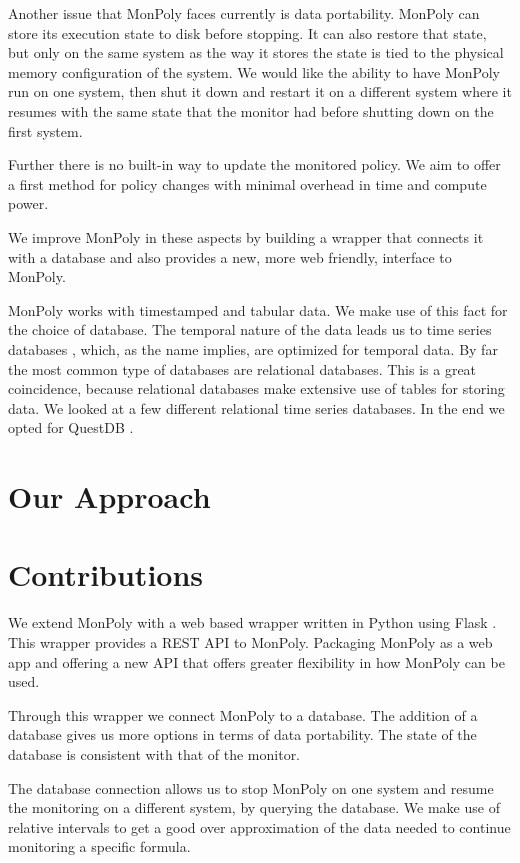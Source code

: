 Another issue that MonPoly faces currently is data portability.
MonPoly can store its execution state to disk before stopping.
It can also restore that state, but only on the same system as the way it stores the state is tied to the physical memory configuration of the system.
We would like the ability to have MonPoly run on one system, then shut it down and restart it on a different system where it resumes with the same state that the monitor had before shutting down on the first system.

Further there is no built-in way to update the monitored policy.
We aim to offer a first method for policy changes with minimal overhead in time and compute power.

We improve MonPoly in these aspects by building a wrapper that connects it with a database and also provides a new, more web friendly, interface to MonPoly.


MonPoly works with timestamped and tabular data.
We make use of this fact for the choice of database.
The temporal nature of the data leads us to time series databases \cite{}, which, as the name implies, are optimized for temporal data.
By far the most common type of databases are relational databases.
This is a great coincidence, because relational databases make extensive use of tables for storing data.
We looked at a few different relational time series databases.
In the end we opted for QuestDB \cite{questdb}.

\section{Our Approach}

\section{Contributions}
We extend MonPoly with a web based wrapper written in Python using Flask \cite{Flask}.
This wrapper provides a REST API \cite{Fielding2000} to MonPoly.
Packaging MonPoly as a web app and offering a new API that offers greater flexibility in how MonPoly can be used.

Through this wrapper we connect MonPoly to a database.
The addition of a database gives us more options in terms of data portability.
The state of the database is consistent with that of the monitor.

The database connection allows us to stop MonPoly on one system and resume the monitoring on a different system, by querying the database.
We make use of relative intervals \cite{Basin2016} to get a good over approximation of the data needed to continue monitoring a specific formula.

